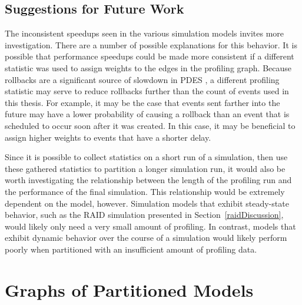\documentclass[11pt]{book}
\begin{document}
\section{Suggestions for Future Work}

The inconsistent speedups seen in the various simulation models invites more investigation. There are a number of possible explanations for this behavior. It is possible that performance speedups could be made more consistent if a different statistic was used to assign weights to the edges in the profiling graph.  Because rollbacks are a significant source of slowdown in PDES \cite{fujimoto-90}, a different profiling statistic may serve to reduce rollbacks further than the count of events used in this thesis. For example, it may be the case that events sent farther into the future may have a lower probability of causing a rollback than an event that is scheduled to occur soon after it was created. In this case, it may be beneficial to assign higher weights to events that have a shorter delay. 

Since it is possible to collect statistics on a short run of a simulation, then use these gathered statistics to partition a longer simulation run, it would also be worth investigating the relationship between the length of the profiling run and the performance of the final simulation. This relationship would be extremely dependent on the model, however. Simulation models that exhibit steady-state behavior, such as the RAID simulation presented in Section~\ref{raidDiscussion}, would likely only need a very small amount of profiling. In contrast, models that exhibit dynamic behavior over the course of a simulation would likely perform poorly when partitioned with an insufficient amount of profiling data.



\appendix
\chapter{Graphs of Partitioned Models}\label{appendixA}
\end{document}
